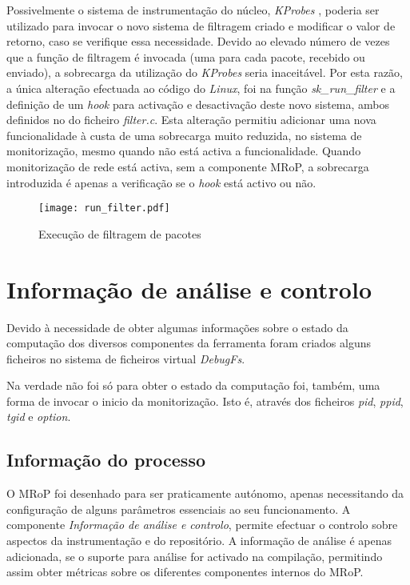 Possivelmente o sistema de instrumentação do núcleo, \textit{KProbes} , poderia ser utilizado para invocar o novo sistema de filtragem criado e modificar o valor de retorno, caso se verifique essa necessidade.
Devido ao elevado número de vezes que a função de filtragem é invocada (uma para cada pacote, recebido ou enviado), a sobrecarga da utilização do \textit{KProbes} seria inaceitável.
Por esta razão, a única alteração efectuada ao código do \textit{Linux}, foi na função \textit{sk\_run\_filter} e a definição de um \textit{hook} para activação e desactivação deste novo sistema, ambos definidos no do ficheiro \textit{filter.c}.
Esta alteração permitiu adicionar uma nova funcionalidade à custa de uma sobrecarga muito reduzida, no sistema de monitorização, mesmo quando não está activa a funcionalidade.
Quando monitorização de rede está activa, sem a componente MRoP, a sobrecarga introduzida é apenas a verificação se o \textit{hook} está activo ou não.

\begin{figure}[ht]
\centering
\texttt{[image: run\_filter.pdf]}
\caption{Execução de filtragem de pacotes}
\label{fig:run_filter}
\end{figure}


\section{Informação de análise e controlo}

Devido à necessidade de obter algumas informações sobre o estado da computação dos diversos componentes da ferramenta foram criados alguns ficheiros no
sistema de ficheiros virtual \textit{DebugFs}.

Na verdade não foi só para obter o estado da computação foi, também, uma forma de invocar o inicio da monitorização.
Isto é, através dos ficheiros \textit{pid}, \textit{ppid}, \textit{tgid} e \textit{option}. 

\subsection{Informação do processo}


O MRoP foi desenhado para ser praticamente autónomo, apenas necessitando da configuração de alguns parâmetros essenciais ao seu funcionamento.
A componente \textit{Informação de análise e controlo}, permite efectuar o controlo sobre aspectos da instrumentação e do repositório.
A informação de análise é apenas adicionada, se o suporte para análise for activado na compilação, permitindo assim obter métricas sobre os diferentes componentes internos do MRoP.


